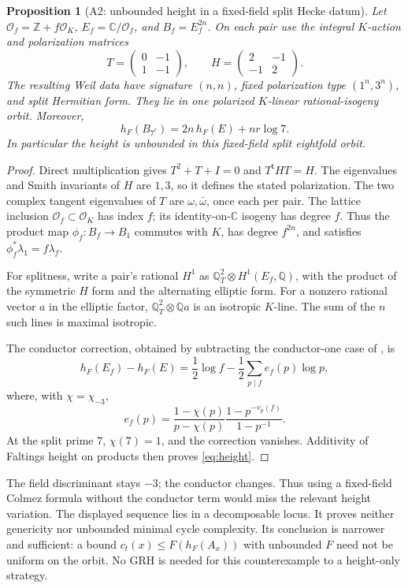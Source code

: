 \documentclass[11pt,a4paper]{article}
\newtheorem{proposition}[theorem]{Proposition}
\theoremstyle{definition}\newtheorem{definition}[theorem]{Definition}
\theoremstyle{remark}\newtheorem{remark}[theorem]{Remark}
\newcommand{\Q}{\mathbb Q}\newcommand{\Z}{\mathbb Z}\newcommand{\C}{\mathbb C}\newcommand{\R}{\mathbb R}
\newcommand{\cO}{\mathcal O}\newcommand{\CH}{\operatorname{CH}}\newcommand{\cl}{\operatorname{cl}}
\begin{document}
\begin{proposition}[A2: unbounded height in a fixed-field split Hecke datum]\label{A2}
Let $\cO_f=\Z+f\cO_K$, $E_f=\C/\cO_f$, and $B_f=E_f^{2n}$. On each pair use the integral $K$-action and polarization matrices
\[
 T=\begin{pmatrix}0&-1\\1&-1\end{pmatrix},\qquad
 H=\begin{pmatrix}2&-1\\-1&2\end{pmatrix}.
\]
The resulting Weil data have signature $(n,n)$, fixed polarization type $(1^n,3^n)$, and split Hermitian form. They lie in one polarized $K$-linear rational-isogeny orbit. Moreover,
\begin{equation}\label{eq:height}
 h_F(B_{7^r})=2n\,h_F(E)+nr\log7.
\end{equation}
In particular the height is unbounded in this fixed-field split eightfold orbit.
\end{proposition}
\begin{proof}
Direct multiplication gives $T^2+T+I=0$ and $T^{\mathsf t}HT=H$. The eigenvalues and Smith invariants of $H$ are $1,3$, so it defines the stated polarization. The two complex tangent eigenvalues of $T$ are $\omega,\bar\omega$, once each per pair. The lattice inclusion $\cO_f\subset\cO_K$ has index $f$; its identity-on-$\C$ isogeny has degree $f$. Thus the product map $\phi_f:B_f\to B_1$ commutes with $K$, has degree $f^{2n}$, and satisfies $\phi_f^*\lambda_1=f\lambda_f$.

For splitness, write a pair's rational $H^1$ as $\Q^2_T\otimes H^1(E_f,\Q)$, with the product of the symmetric $H$ form and the alternating elliptic form. For a nonzero rational vector $a$ in the elliptic factor, $\Q^2_T\otimes\Q a$ is an isotropic $K$-line. The sum of the $n$ such lines is maximal isotropic.

The conductor correction, obtained by subtracting the conductor-one case of \citet[Theorem~1.3]{Heights17}, is
\[
 h_F(E_f)-h_F(E)=\frac12\log f-\frac12\sum_{p\mid f}e_f(p)\log p,
\]
where, with $\chi=\chi_{-3}$,
\[
 e_f(p)=\frac{1-\chi(p)}{p-\chi(p)}
 \frac{1-p^{-v_p(f)}}{1-p^{-1}}.
\]
At the split prime $7$, $\chi(7)=1$, and the correction vanishes. Additivity of Faltings height on products then proves \eqref{eq:height}.
\end{proof}

The field discriminant stays $-3$; the conductor changes. Thus using a fixed-field Colmez formula without the conductor term would miss the relevant height variation. The displayed sequence lies in a decomposable locus. It proves neither genericity nor unbounded minimal cycle complexity. Its conclusion is narrower and sufficient: a bound $c_t(x)\le F(h_F(A_x))$ with unbounded $F$ need not be uniform on the orbit. No GRH is needed for this counterexample to a height-only strategy.
\end{document}

